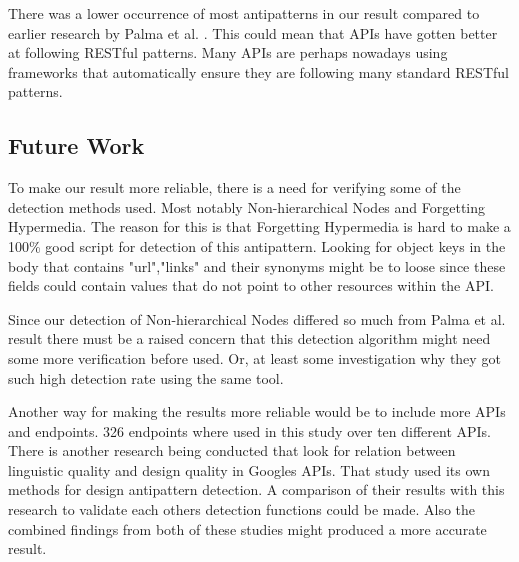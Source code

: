 \documentclass[a4paper,12pt]{article}
\begin{document}
There was a lower occurrence of most antipatterns in our result compared to earlier research by Palma et al. \cite{design}\cite{linguistic}. This could mean that APIs have gotten better at following RESTful patterns. Many APIs are perhaps nowadays using frameworks that automatically ensure they are following many standard RESTful patterns.

\subsection{Future Work}

To make our result more reliable, there is a need for verifying some of the detection methods used. Most notably Non-hierarchical Nodes and Forgetting Hypermedia. The reason for this is that Forgetting Hypermedia is hard to make a 100\% good script for detection of this antipattern. Looking for object keys in the body that contains "url","links" and their synonyms might be to loose since these fields could contain values that do not point to other resources within the API. 

Since our detection of Non-hierarchical Nodes differed so much from Palma et al. \cite{linguistic} result there must be a raised concern that this detection algorithm might need some more verification before used. Or, at least some investigation why they got such high detection rate using the same tool.

Another way for making the results more reliable would be to include more APIs and endpoints. 326 endpoints where used in this study over ten different APIs. There is another research being conducted that look for relation between linguistic quality and design quality in Googles APIs. That study used its own methods for design antipattern detection. A comparison of their results with this research to validate each others detection functions could be made. Also the combined findings from both of these studies might produced a more accurate result.

\newpage


%
\newpage


\hypersetup{urlcolor=black}


\newpage
\setcounter{page}{1} %
\appendix
\end{document}
